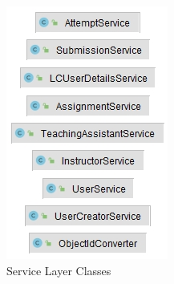 \documentclass[a4paper, 12pt]{article}
\begin{document}
\begin{figure}[H]
{        \includegraphics[width=\linewidth]{small-groups/service-layer.jpg}
        \caption{Service Layer Classes}\label{fig:awesome_image2}
        \endminipage}\hfill
        \end{figure}
\end{document}
